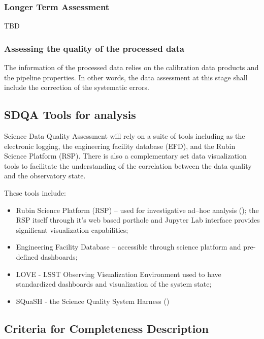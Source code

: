 \subsubsection{Longer Term Assessment}

TBD

\subsubsection{Assessing the quality of the processed data}

The information of the processed data relies on the calibration data products and the pipeline properties. In other words, the data assessment at this stage shall include the correction of the systematic errors. 

\subsection{SDQA Tools for analysis}

Science Data Quality Assessment will rely on a suite of tools including as the electronic logging, the engineering facility database (EFD), and the Rubin Science Platform (RSP).  There is also a complementary set data visualization tools to facilitate the understanding of the correlation between the data quality and the observatory state. 

These tools include:

\begin{itemize}

	\item Rubin Science Platform (RSP) -- used for investigative ad--hoc analysis ();  the RSP itself through it's web based porthole and Jupyter Lab interface provides significant visualization capabilities;
	\item Engineering Facility Database -- accessible through science platform and pre-defined dashboards;
	\item LOVE - LSST Observing Visualization Environment used to have standardized dashboards and visualization of the system state;
	\item SQuaSH - the Science Quality System Harness ()

\end{itemize}

\subsection{Criteria for Completeness Description}

